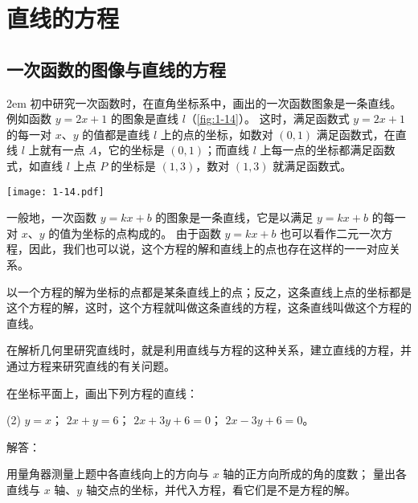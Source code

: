 \section{直线的方程}
\subsection{一次函数的图像与直线的方程}
\noindent
\begin{minipage}{0.65\linewidth}\parindent2em
初中研究一次函数时，在直角坐标系中，画出的一次函数图象是一条直线。
例如函数 $y=2x+1$ 的图象是直线 $l$（\cref{fig:1-14}）。
这时，满足函数式 $y=2x+1$ 的每一对 $x$、$y$ 的值都是直线 $l$ 上的点的坐标，如数对 $(0,1)$ 满足函数式，在直线 $l$ 上就有一点 $A$，它的坐标是 $(0,1)$；而直线  $l$ 上每一点的坐标都满足函数式，如直线 $l$ 上点 $P$ 的坐标是 $(1,3)$，数对 $(1,3)$ 就满足函数式。
\end{minipage}\hfill
\begin{minipage}{0.3\linewidth}\centering
\begin{figurehere}
  \texttt{[image: 1-14.pdf]}
  \caption{}\label{fig:1-14}
\end{figurehere}
\end{minipage}

\medskip
一般地，一次函数 $y=kx+b$ 的图象是一条直线，它是以满足 $y=kx+b$ 的每一对 $x$、$y$ 的值为坐标的点构成的。
由于函数 $y=kx+b$ 也可以看作二元一次方程，因此，我们也可以说，这个方程的解和直线上的点也存在这样的一一对应关系。

以一个方程的解为坐标的点都是某条直线上的点；反之，这条直线上点的坐标都是这个方程的解，这时，这个方程就叫做这条直线的方程，这条直线叫做这个方程的直线。

在解析几何里研究直线时，就是利用直线与方程的这种关系，建立直线的方程，并通过方程来研究直线的有关问题。

\begin{Practice}
  \begin{question}
    \item 在坐标平面上，画出下列方程的直线：
    \begin{tasks}(2)
      \task $y=x$；
      \task $2x+y=6$；
      \task $2x+3y+6=0$；
      \task $2x-3y+6=0$。
    \end{tasks}
    \item 解答：
    \begin{tasks}
      \task 用量角器测量上题中各直线向上的方向与 $x$ 轴的正方向所成的角的度数；
      \task 量出各直线与 $x$ 轴、$y$ 轴交点的坐标，并代入方程，看它们是不是方程的解。
    \end{tasks}
  \end{question}
\end{Practice}

